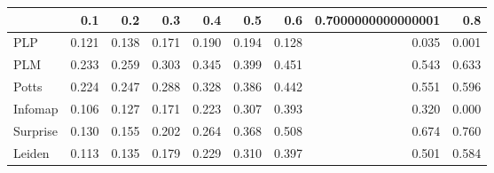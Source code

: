 \begin{tabular}{lrrrrrrrr}
\toprule
{} &   0.1 &   0.2 &   0.3 &   0.4 &   0.5 &   0.6 & 0.7000000000000001 &   0.8 \\
\midrule
PLP      & 0.121 & 0.138 & 0.171 & 0.190 & 0.194 & 0.128 &              0.035 & 0.001 \\
PLM      & 0.233 & 0.259 & 0.303 & 0.345 & 0.399 & 0.451 &              0.543 & 0.633 \\
Potts    & 0.224 & 0.247 & 0.288 & 0.328 & 0.386 & 0.442 &              0.551 & 0.596 \\
Infomap  & 0.106 & 0.127 & 0.171 & 0.223 & 0.307 & 0.393 &              0.320 & 0.000 \\
Surprise & 0.130 & 0.155 & 0.202 & 0.264 & 0.368 & 0.508 &              0.674 & 0.760 \\
Leiden   & 0.113 & 0.135 & 0.179 & 0.229 & 0.310 & 0.397 &              0.501 & 0.584 \\
\bottomrule
\end{tabular}
